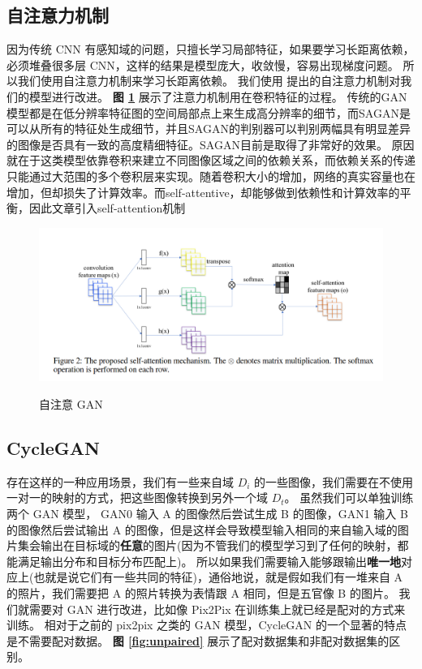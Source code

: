 \subsection{自注意力机制}
因为传统 CNN 有感知域的问题，只擅长学习局部特征，如果要学习长距离依赖，必须堆叠很多层 CNN，这样的结果是模型庞大，收敛慢，容易出现梯度问题。
所以我们使用自注意力机制来学习长距离依赖。
我们使用 提出的自注意力机制对我们的模型进行改进。
\textbf{图 \ref{fig:sagan}} 展示了注意力机制用在卷积特征的过程。
传统的GAN模型都是在低分辨率特征图的空间局部点上来生成高分辨率的细节，而SAGAN是可以从所有的特征处生成细节，并且SAGAN的判别器可以判别两幅具有明显差异的图像是否具有一致的高度精细特征。SAGAN目前是取得了非常好的效果。
原因就在于这类模型依靠卷积来建立不同图像区域之间的依赖关系，而依赖关系的传递只能通过大范围的多个卷积层来实现。随着卷积大小的增加，网络的真实容量也在增加，但却损失了计算效率。而self-attentive，却能够做到依赖性和计算效率的平衡，因此文章引入self-attention机制

\begin{figure}[h!]
	\caption{自注意 GAN}
	\centering
	\includegraphics[width=\textwidth]{figure/resources/SAGAN.png}
	\label{fig:sagan}
\end{figure}


\subsection{CycleGAN}
存在这样的一种应用场景，我们有一些来自域 $D_i$ 的一些图像，我们需要在不使用一对一的映射的方式，把这些图像转换到另外一个域 $D_t$。
虽然我们可以单独训练两个 GAN 模型， GAN0 输入 A 的图像然后尝试生成 B 的图像，GAN1 输入 B 的图像然后尝试输出 A 的图像，但是这样会导致模型输入相同的来自输入域的图片集会输出在目标域的\textbf{任意}的图片(因为不管我们的模型学习到了任何的映射，都能满足输出分布和目标分布匹配上)。
所以如果我们需要输入能够跟输出\textbf{唯一地}对应上(也就是说它们有一些共同的特征)，通俗地说，就是假如我们有一堆来自 A 的照片，我们需要把 A 的照片转换为表情跟 A 相同，但是五官像 B 的图片。
我们就需要对 GAN 进行改进，比如像 Pix2Pix 在训练集上就已经是配对的方式来训练。
相对于之前的 pix2pix 之类的 GAN 模型，CycleGAN 的一个显著的特点是不需要配对数据。
\textbf{图 \ref{fig:unpaired}} 展示了配对数据集和非配对数据集的区别。

